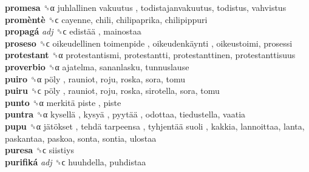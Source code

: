 \textbf{promesa} ␝α   juhlallinen vakuutus , todistajanvakuutus, todistus, vahvistus  \\
\textbf{promèntè} ␝ϲ  cayenne, chili, chilipaprika, chilipippuri  \\
\textbf{propagá} \emph{adj}  ␝ϲ   edistää , mainostaa  \\
\textbf{proseso} ␝ϲ   oikeudellinen toimenpide ,  oikeudenkäynti , oikeustoimi, prosessi  \\
\textbf{protestant} ␝α  protestantismi, protestantti, protestanttinen, protestanttisuus  \\
\textbf{proverbio} ␝α  ajatelma, sananlasku, tunnuslause  \\
\textbf{puiro} ␝α   pöly , rauniot, roju, roska, sora, tomu  \\
\textbf{puiru} ␝ϲ   pöly , rauniot, roju, roska, sirotella, sora, tomu  \\
\textbf{punto} ␝α   merkitä piste , piste  \\
\textbf{puntra} ␝α   kysellä ,  kysyä ,  pyytää , odottaa, tiedustella, vaatia  \\
\textbf{pupu} ␝α   jätökset ,  tehdä tarpeensa ,  tyhjentää suoli , kakkia, lannoittaa, lanta, paskantaa, paskoa, sonta, sontia, ulostaa  \\
\textbf{puresa} ␝ϲ  siistiys  \\
\textbf{purifiká} \emph{adj}  ␝ϲ  huuhdella, puhdistaa  \\
